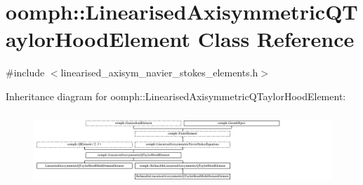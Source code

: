 \hypertarget{classoomph_1_1LinearisedAxisymmetricQTaylorHoodElement}{}\section{oomph\+:\+:Linearised\+Axisymmetric\+Q\+Taylor\+Hood\+Element Class Reference}
\label{classoomph_1_1LinearisedAxisymmetricQTaylorHoodElement}


{\ttfamily \#include $<$linearised\+\_\+axisym\+\_\+navier\+\_\+stokes\+\_\+elements.\+h$>$}

Inheritance diagram for oomph\+:\+:Linearised\+Axisymmetric\+Q\+Taylor\+Hood\+Element\+:\begin{figure}[H]
\begin{center}
\leavevmode
\includegraphics[height=2.786070cm]{classoomph_1_1LinearisedAxisymmetricQTaylorHoodElement}
\end{center}
\end{figure}
